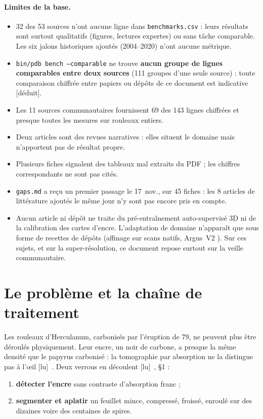 \documentclass[11pt,a4paper]{article}
\newcommand{\lu}{\textsf{\small[lu]}}
\newcommand{\deduit}{\textsf{\small[déduit]}}
\begin{document}
\paragraph{Limites de la base.}
\begin{itemize}
  \item 32 des 53 sources n'ont aucune ligne dans \texttt{benchmarks.csv} : leurs résultats
  sont surtout qualitatifs (figures, lectures expertes) ou sans tâche comparable. Les six
  jalons historiques ajoutés (2004–2020) n'ont aucune métrique.
  \item \texttt{bin/pdb bench --comparable} ne trouve \textbf{aucun groupe de lignes
  comparables entre deux sources} (111 groupes d'une seule source) : toute comparaison
  chiffrée entre papiers ou dépôts de ce document est indicative \deduit.
  \item Les 11 sources communautaires fournissent 69 des 143 lignes chiffrées et presque
  toutes les mesures sur rouleaux entiers.
  \item Deux articles sont des revues narratives \cite{damiani2021,perino2024} : elles
  situent le domaine mais n'apportent pas de résultat propre.
  \item Plusieurs fiches signalent des tableaux mal extraits du PDF ; les chiffres
  correspondants ne sont pas cités.
  \item \texttt{gaps.md} a reçu un premier passage le 17~nov., sur 45 fiches : les 8
  articles de littérature ajoutés le même jour n'y sont pas encore pris en compte.
  \item Aucun article ni dépôt ne traite du pré-entraînement auto-supervisé 3D ni de la
  calibration des cartes d'encre. L'adaptation de domaine n'apparaît que sous forme de
  recettes de dépôts (affinage sur scans natifs, Argus~V2 \cite{ruiconte2026}). Sur ces
  sujets, et sur la super-résolution, ce document repose surtout sur la veille
  communautaire.
\end{itemize}

\section{Le problème et la chaîne de traitement}

Les rouleaux d'Herculanum, carbonisés par l'éruption de 79, ne peuvent plus être déroulés
physiquement. Leur encre, un noir de carbone, a presque la même densité que le papyrus
carbonisé : la tomographie par absorption ne la distingue pas à l'œil
\lu~\cite{mocella2015,parsons2023}. Deux verrous en découlent \lu~\cite{parsons2023}, §1 :
\begin{enumerate}
  \item \textbf{détecter l'encre} sans contraste d'absorption franc ;
  \item \textbf{segmenter et aplatir} un feuillet mince, compressé, froissé, enroulé sur des
  dizaines voire des centaines de spires.
\end{enumerate}
\end{document}
